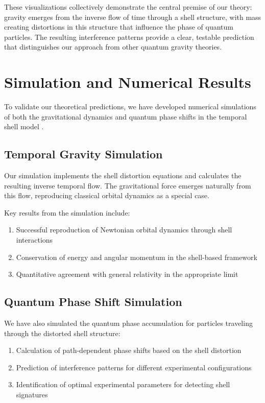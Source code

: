\documentclass[12pt,a4paper]{article}
\begin{document}
These visualizations collectively demonstrate the central premise of our theory: gravity emerges from the inverse flow of time through a shell structure, with mass creating distortions in this structure that influence the phase of quantum particles. The resulting interference patterns provide a clear, testable prediction that distinguishes our approach from other quantum gravity theories.

\section{Simulation and Numerical Results}

To validate our theoretical predictions, we have developed numerical simulations of both the gravitational dynamics and quantum phase shifts in the temporal shell model \citep{nielsen}.

\subsection{Temporal Gravity Simulation}

Our simulation implements the shell distortion equations and calculates the resulting inverse temporal flow. The gravitational force emerges naturally from this flow, reproducing classical orbital dynamics as a special case.

Key results from the simulation include:

\begin{enumerate}
    \item Successful reproduction of Newtonian orbital dynamics through shell interactions
    \item Conservation of energy and angular momentum in the shell-based framework
    \item Quantitative agreement with general relativity in the appropriate limit
\end{enumerate}

\subsection{Quantum Phase Shift Simulation}

We have also simulated the quantum phase accumulation for particles traveling through the distorted shell structure:

\begin{enumerate}
    \item Calculation of path-dependent phase shifts based on the shell distortion
    \item Prediction of interference patterns for different experimental configurations
    \item Identification of optimal experimental parameters for detecting shell signatures
\end{enumerate}
\end{document}
